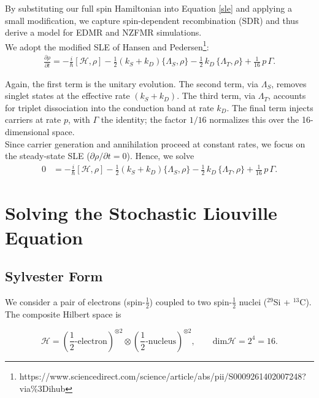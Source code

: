 \documentclass[svgnames]{article}
\begin{document}
By substituting our full spin Hamiltonian into Equation \ref{sle} and applying
a small modification, we capture spin-dependent recombination (SDR) and thus
derive a model for EDMR and NZFMR simulations. \\

We adopt the modified SLE of Hansen and Pedersen\footnote{%
  https://www.sciencedirect.com/science/article/abs/pii/S0009261402007248?via\%3Dihub%
}:
\begin{align} \label{}
    \frac{\partial \rho}{\partial t}
    = -\frac{i}{\hbar}[\mathcal{H}, \rho]
    - \tfrac{1}{2}(k_S + k_D)\{\Lambda_S, \rho\}
    - \tfrac{1}{2}\,k_D\,\{\Lambda_T, \rho\}
    + \tfrac{1}{16}\,p\,\Gamma.
\end{align}

Again, the first term is the unitary evolution.  
The second term, via $\Lambda_S$, removes singlet states at the effective rate
$(k_S + k_D)$.  
The third term, via $\Lambda_T$, accounts for triplet dissociation into the
conduction band at rate $k_D$.  
The final term injects carriers at rate $p$, with $\Gamma$ the identity; the
factor $1/16$ normalizes this over the 16-dimensional space. \\

Since carrier generation and annihilation proceed at constant rates, we
focus on the steady-state SLE ($\partial\rho/\partial t = 0$). Hence, we solve
\begin{align} \label{}
    0
    &= -\frac{i}{\hbar}[\mathcal{H}, \rho]
       - \tfrac{1}{2}(k_S + k_D)\{\Lambda_S, \rho\}
       - \tfrac{1}{2}\,k_D\,\{\Lambda_T, \rho\}
       + \tfrac{1}{16}\,p\,\Gamma.
\end{align}

\newpage
\section{Solving the Stochastic Liouville Equation}

\subsection{Sylvester Form}

We consider a pair of electrons (spin-$\frac{1}{2}$) coupled to two
spin-$\frac{1}{2}$ nuclei ($^{29}$Si + $^{13}$C). The composite Hilbert space is 

\[
    \mathcal{H} = \left(\frac{1}{2}\text{-electron}\right)^{\otimes 2} \otimes
\left(\frac{1}{2}\text{-nucleus} \right)^{\otimes 2}, \qquad
\text{dim}\mathcal{H} = 2^4 = 16. 
\] \vspace{3px}
\end{document}
